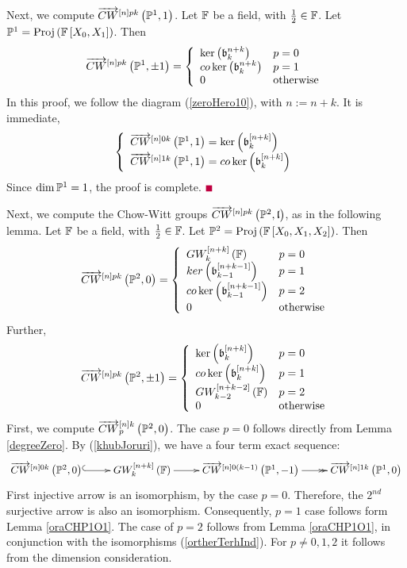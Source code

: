\documentclass[12pt]{article}
\begin{document}
\vspace{3mm}
Next, we compute $\ora{CW}^{\LRt{n}pk}\LRf{{\BP}^1, 1}$. 
\bL\label{oraCHP1O1}{\rm 
Let ${\BF}$ be a field, with $\frac{1}{2}\in {\BF}$. Let ${\BP}^1=\proj{{\BF}\LRt{X_0, X_1}}$. 
Then 
$$
\ora{CW}^{\LRt{n}pk}\LRf{{\BP}^1,  \pm 1} =
\LBrace{{ll}
\ker\LRf{\b_k^{n+k}}   & p=0\\
co\ker\LRf{\b_k^{n+k}}  & p=1 \\
0 & {\rm otherwise} \\
}
$$
}
\eL
\pf In this proof, we follow the diagram (\ref{zeroHero10}), %
with $n:=n+k$. It is immediate,
$$
\LBrace{{l}
\ora{CW}^{\LRt{n}0k}\LRf{{\BP}^1, 1} %
= \ker\LRf{\b_k^{\LRt{n+k}}}\\
\ora{CW}^{\LRt{n}1k}\LRf{{\BP}^1, 1} %
= co\ker\LRf{\b_k^{\LRt{n+k}}}\\
}
$$
Since $\dim {\BP}^1=1$, the proof is complete. $\eop$


\vspace{3mm}
Next, we compute the Chow-Witt groups $\ora{CW}^{\LRt{n}pk}\LRf{{\BP}^2, \l}$, as in the following lemma.
\bL\label{P2e00done}{\rm 
Let ${\BF}$ be a field, with $\frac{1}{2}\in {\BF}$. Let ${\BP}^2=\proj{{\BF}\LRt{X_0, X_1, X_2}}$. Then 
 $$
 \ora{CW}^{\LRt{n}pk}\LRf{{\BP}^2, 0}=  
 \LBrace{{ll}
GW^{\LRt{n+k}}_k\LRf{{\BF}} & p=0\\
ker\LRf{\b_{k-1}^{\LRt{n+k-1}}}  & p=1\\
co\ker\LRf{\b_{k-1}^{\LRt{n+k-1}}} & p=2\\
  0 & {\rm otherwise}\\
 }
 $$
 Further,
 $$
 \ora{CW}^{\LRt{n}pk}\LRf{{\BP}^2, \pm 1} =
 \LBrace{{ll}
\ker\LRf{\b^{\LRt{n+k}}_k} &p=0\\
 co\ker\LRf{\b^{\LRt{n+k}}_k}& p=1\\
GW_{k-2}^{\LRt{n+k-2}}\LRf{{\BF}}& p=2\\
  0 & {\rm otherwise}\\
 }
 $$
 }
 \eL 
 \pf First, we compute $ \ora{CW}_p^{\LRt{n}k}\LRf{{\BP}^2, 0}$. The case $p=0$  follows 
 directly from Lemma \ref{degreeZero}. By (\ref{khubJoruri}), %
 we have a four term exact sequence:
 $$
   \diagram
 \ora{CW}^{\LRt{n}0k}\LRf{{\BP}^2, 0} \ar@{^(->}[r] &  GW^{\LRt{n+k}}_k\LRf{{\BF}} \ar[r] &
  \ora{CW}^{\LRt{n}0\LRf{k-1}}\LRf{{\BP}^{1}, -1} \ar@{->>}[r] &
 \ora{CW}^{\LRt{n}1k}\LRf{{\BP}^1, 0} \\
 \enddiagram
 $$
 First injective arrow is an isomorphism, by the case $p=0$. Therefore, the $2^{nd}$ surjective arrow
 is also an isomorphism. Consequently,
 $p=1$ case follows form Lemma \ref{oraCHP1O1}. The case of $p=2$ follows from 
 Lemma \ref{oraCHP1O1}, in conjunction with the isomorphisms (\ref{ortherTerhInd}). For  $p\neq 0, 1, 2$
 it follows from the dimension consideration. 
 
\end{document}
